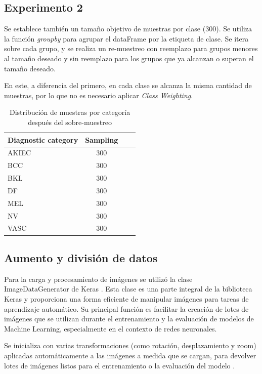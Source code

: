 \subsection{Experimento 2}

Se establece también un tamaño objetivo de muestras por clase ($300$). Se utiliza la función \textit{groupby} para agrupar el dataFrame por la etiqueta de clase. Se itera sobre cada grupo, y se realiza un re-muestreo con reemplazo para grupos menores al tamaño deseado y sin reemplazo para los grupos que ya alcanzan o superan el tamaño deseado.

En este, a diferencia del primero, en cada clase se alcanza la misma cantidad de muestras, por lo que no es necesario aplicar \textit{Class Weighting}.

\begin{table}[ht]
   \centering
   \begin{tabular}{lccc}
   \hline
   Diagnostic category & Sampling  \\ \hline
   AKIEC & 300 \\
   BCC & 300 \\
   BKL & 300 \\
   DF & 300 \\
   MEL & 300 \\
   NV & 300 \\
   VASC & 300 \\ \hline
   \end{tabular}
   \caption{Distribución de muestras por categoría después del sobre-muestreo}
   \label{tab:sampling_distribution}
   \end{table}

\subsection{Aumento y división de datos}

Para la carga y procesamiento de imágenes se utilizó la clase ImageDataGenerator de Keras . Esta clase es una parte integral de la biblioteca Keras y proporciona una forma eficiente de manipular imágenes para tareas de aprendizaje automático. Su principal función es facilitar la creación de lotes de imágenes que se utilizan durante el entrenamiento y la evaluación de modelos de Machine Learning, especialmente en el contexto de redes neuronales. 

Se inicializa con varias transformaciones (como rotación, desplazamiento y zoom) aplicadas automáticamente a las imágenes a medida que se cargan, para devolver lotes de imágenes listos para el entrenamiento o la evaluación del modelo .

